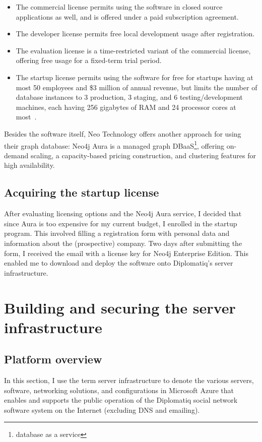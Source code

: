 \begin{itemize}
\item The commercial license permits using the software in closed source applications as well, and is offered under a paid subscription agreement.
\item The developer license permits free local development usage after registration.
\item The evaluation license is a time-restricted variant of the commercial license, offering free usage for a fixed-term trial period.
\item The startup license permits using the software for free for startups having at most 50 employees and \$3 million of annual revenue, but limits the number of database instances to 3 production, 3 staging, and 6 testing/development machines, each having 256 gigabytes of RAM and 24 processor cores at most~\cite{neo4j-startup-program}.
\end{itemize}

Besides the software itself, Neo Technology offers another approach for using their graph database: Neo4j Aura is a managed graph DBaaS\footnote{database as a service}, offering on-demand scaling, a capacity-based pricing construction, and clustering features for high availability.

\subsection{Acquiring the startup license}

After evaluating licensing options and the Neo4j Aura service, I decided that since Aura is too expensive for my current budget, I enrolled in the startup program. This involved filling a registration form with personal data and information about the (prospective) company. Two days after submitting the form, I received the email with a license key for Neo4j Enterprise Edition. This enabled me to download and deploy the software onto Diplomatiq's server infrastructure.

\section{Building and securing the server infrastructure}

\subsection{Platform overview}

In this section, I use the term server infrastructure to denote the various servers, software, networking solutions, and configurations in Microsoft Azure that enables and supports the public operation of the Diplomatiq social network software system on the Internet (excluding DNS and emailing).

